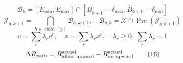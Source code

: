 \documentclass{article}
\begin{document}
\begin{equation}
\mathcal B_k=[E_{\min},E_{\max}]\cap[\underline B_{k+1}-\delta_{\max},\overline B_{k+1}-\delta_{\min}]
\tag{13}
\end{equation}
\begin{equation}
\mathcal J_{g,k+1}=\bigcap_{h\in\operatorname{child}(g)}\mathcal B_{h,k+1},\quad\mathcal B_{g,k}=\mathcal X\cap\operatorname{Pre}(\mathcal J_{g,k+1})
\tag{14}
\end{equation}
\begin{equation}
v=\sum_r\lambda_rv^r,\quad x=\sum_r\lambda_rx^r,\quad\lambda_r\ge0,\ \sum_r\lambda_r=1
\tag{15}
\end{equation}
\begin{equation}
\Delta R_{\rm path}=R_{\rm allow\ upward}^{\rm actual}-R_{\rm no\ upward}^{\rm actual}
\tag{16}
\end{equation}
\end{document}
